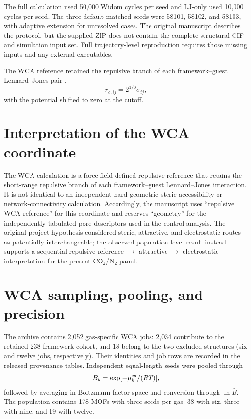 \documentclass[11pt,a4paper]{article}
\begin{document}
The full calculation used 50,000 Widom cycles per seed and LJ-only used 10,000 cycles per seed. The three default matched seeds were 58101, 58102, and 58103, with adaptive extension for unresolved cases. The original manuscript describes the protocol, but the supplied ZIP does not contain the complete structural CIF and simulation input set. Full trajectory-level reproduction requires those missing inputs and any external executables.

The WCA reference retained the repulsive branch of each framework--guest Lennard--Jones pair \cite{weeks1971wca},
\begin{equation}
r_{c,ij}=2^{1/6}\sigma_{ij},
\end{equation}
with the potential shifted to zero at the cutoff.

\section{Interpretation of the WCA coordinate}

The WCA calculation is a force-field-defined repulsive reference that retains the short-range repulsive branch of each framework--guest Lennard--Jones interaction. It is not identical to an independent hard-geometric steric-accessibility or network-connectivity calculation. Accordingly, the manuscript uses ``repulsive WCA reference'' for this coordinate and reserves ``geometry'' for the independently tabulated pore descriptors used in the control analysis. The original project hypothesis considered steric, attractive, and electrostatic routes as potentially interchangeable; the observed population-level result instead supports a sequential repulsive-reference $\rightarrow$ attractive $\rightarrow$ electrostatic interpretation for the present CO$_2$/N$_2$ panel.

\section{WCA sampling, pooling, and precision}

The archive contains 2,052 gas-specific WCA jobs: 2,034 contribute to the retained 238-framework cohort, and 18 belong to the two excluded structures (six and twelve jobs, respectively). Their identities and job rows are recorded in the released provenance tables. Independent equal-length seeds were pooled through
\begin{equation}
B_k=\exp[-\mu_k^{\rm ex}/(RT)],
\end{equation}
followed by averaging in Boltzmann-factor space and conversion through $\ln\bar B$. The population contains 178 MOFs with three seeds per gas, 38 with six, three with nine, and 19 with twelve.
\end{document}
